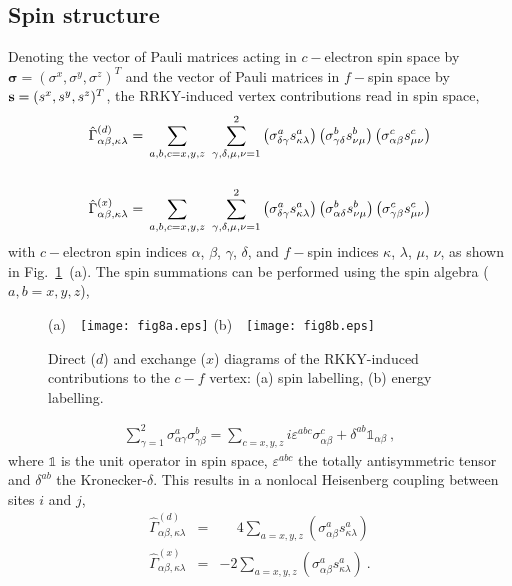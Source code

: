 \documentclass[12pt,twoside]{article}
\newcommand{\bsig}{\boldsymbol\sigma}
\begin{document}
\subsection{Spin structure}
\label{subsec:RKKYvertex-spin}

Denoting the vector of Pauli matrices acting in $c-$electron spin space 
by $\bsig =(\sigma^x,\sigma^y,\sigma^z)^T$ and the vector of Pauli matrices 
in $f-$spin space by ${\bf s}=(s^x,s^y,s^z)^T$,  
the RRKY-induced vertex contributions read in spin space,
\begin{eqnarray}
\hat\Gamma^{(d)}_{\alpha\beta, \kappa\lambda} &=& \hspace*{-0.2cm}
\sum_{a,b,c=x,y,z}\ \sum_{\gamma,\delta,\mu,\nu=1}^2
\left( \sigma^{a}_{\delta\gamma}s^{a}_{\kappa\lambda}\right) 
\left( \sigma^{b}_{\gamma\delta}s^{b}_{\nu\mu}\right) 
\left( \sigma^{c}_{\alpha\beta}s^{c}_{\mu\nu}\right)\nonumber\\ 
\label{eq:gamma_spin-d}\\
\hat\Gamma^{(x)}_{\alpha\beta, \kappa\lambda} &=& \hspace*{-0.2cm}
\sum_{a,b,c=x,y,z}\ \sum_{\gamma,\delta,\mu,\nu=1}^2
\left( \sigma^{a}_{\delta\gamma}s^{a}_{\kappa\lambda}\right) 
\left( \sigma^{b}_{\alpha\delta}s^{b}_{\nu\mu}\right) 
\left( \sigma^{c}_{\gamma\beta}s^{c}_{\mu\nu}\right)\nonumber\\ 
\label{eq:gamma_spin-x}
\end{eqnarray}
with $c-$electron spin indices $\alpha$, $\beta$, $\gamma$, $\delta$, and 
$f-$spin indices $\kappa$, $\lambda$, $\mu$, $\nu$, 
as shown in Fig.~\ref{fig:RKKYvertex}~(a). The spin summations can be 
performed using the spin algebra ($a,b=x,y,z$), 
\begin{figure}[t]
\centering
(a)\ \ \texttt{[image: fig8a.eps]}\hfill
(b)\ \ \texttt{[image: fig8b.eps]}
\caption{\label{fig:RKKYvertex} 
Direct ($d$) and exchange ($x$) diagrams 
of the RKKY-induced contributions to the $c-f$ vertex: (a) 
spin labelling, (b) energy labelling.}
\end{figure}
\begin{eqnarray}
\sum_{\gamma=1}^2
\sigma^{a}_{\alpha\gamma}\sigma^{b}_{\gamma\beta} = \sum_{c=x,y,z}
i \varepsilon^{abc} \sigma^{c}_{\alpha\beta}
+\delta^{ab}\mathds{1}_{\alpha\beta} \ ,
\label{eq:spin_algebra}
\end{eqnarray}
where $\mathds{1}$ is the unit operator in spin space,   
$\varepsilon^{abc}$ the totally antisymmetric tensor and 
$\delta^{ab}$ the Kronecker-$\delta$. This results in a nonlocal 
Heisenberg coupling between sites $i$ and $j$,   
\begin{eqnarray}
\hat\Gamma^{(d)}_{\alpha\beta, \kappa\lambda} &=& 
\phantom{+}4 \sum_{a=x,y,z}
\left( \sigma^{a}_{\alpha\beta}s^{a}_{\kappa\lambda}\right) 
\label{eq:gamma_spin_d2}\\
\hat\Gamma^{(x)}_{\alpha\beta, \kappa\lambda} &=& 
-2 \sum_{a=x,y,z}
\left( \sigma^{a}_{\alpha\beta}s^{a}_{\kappa\lambda}\right) 
\label{eq:gamma_spin_x2} \ .
\end{eqnarray}
\end{document}
